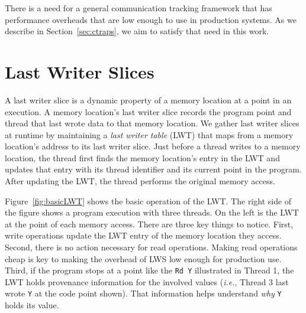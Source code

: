 \documentclass[10pt,nocopyrightspace]{sigplanconf}
\newcommand{\lws}{LWS\xspace}
\newcommand{\lwt}{LWT\xspace}
\begin{document}
There is a need for a general communication tracking framework that has
performance overheads that are low enough to use in production systems.  As we
describe in Section~\ref{sec:ctraps}, we aim to satisfy that need in this work.








\section{Last Writer Slices}
\label{sec:lastwriterslices}
A last writer slice is a dynamic property of a memory location at a point in an
execution.   A memory location's last writer slice records the program point
and thread that last wrote data to that memory location.  We gather last writer
slices at runtime by maintaining a {\em last writer table} (\lwt) that maps
from a memory location's address to its last writer slice.  Just before a
thread writes to a memory location, the thread first finds the memory
location's entry in the \lwt and updates that entry with its thread identifier
and its current point in the program.  After updating the \lwt, the thread
performs the original memory access.  


Figure~\ref{fig:basicLWT} shows the basic operation of the \lwt.  The right
side of the figure shows a program execution with three threads.  On the left
is the \lwt at the point of each memory access.  There are three key things to
notice.  First, write operations update the \lwt entry of the memory location
they access.  Second, there is no action necessary for read operations.  Making
read operations cheap is key to making the overhead of \lws low
enough for production use.  Third, if the program stops at a point like the
{\tt Rd Y} illustrated in Thread 1, the \lwt holds provenance information for
the involved values ({\em i.e.}, Thread 3 last wrote {\tt Y} at the code point
shown). That information helps understand {\em why} {\tt Y} holds its value.
\end{document}
